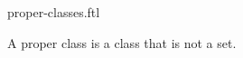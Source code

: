 \documentclass{naproche-library}
\begin{document}
\begin{smodule}[title=Proper Classes]{proper-classes.ftl}

\begin{definition}[forthel,id=FOUNDATIONS_10_8452102365965847]
  A proper class is a class that is not a set.
\end{definition}
\end{smodule}
\end{document}
